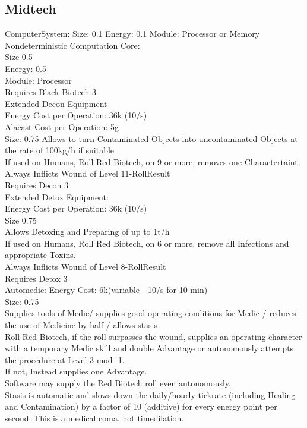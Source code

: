 \subsection{Midtech}
ComputerSystem:
Size: 0.1
Energy: 0.1
Module: Processor or Memory\\
\newline
Nondeterministic Computation Core:\\
Size 0.5\\
Energy: 0.5\\
Module: Processor\\
Requires Black Biotech 3\\
\newline
Extended Decon Equipment\\
Energy Cost per Operation: 36k (10/s)\\
Alacast Cost per Operation: 5g\\
Size: 0.75
Allows to turn Contaminated Objects into uncontaminated Objects at the rate of 100kg/h if suitable\\
If used on Humans, Roll Red Biotech, on 9 or more, removes one Charactertaint.\\
Always Inflicts Wound of Level 11-RollResult\\
Requires Decon 3\\
\newline
Extended Detox Equipment:\\
Energy Cost per Operation: 36k (10/s)\\
Size 0.75\\
Allows Detoxing and Preparing of up to 1t/h\\
If used on Humans, Roll Red Biotech, on 6 or more, remove all Infections and appropriate Toxins.\\
Always Inflicts Wound of Level 8-RollResult\\
Requires Detox 3\\
\newline
Automedic:
Energy Cost: 6k(variable - 10/s for 10 min)\\
Size: 0.75\\
Supplies tools of Medic/ supplies good operating conditions for Medic / reduces the use of Medicine by half / allows stasis\\
Roll Red Biotech, if the roll surpasses the wound, supplies an operating character with a temporary Medic skill and
double Advantage or autonomously attempts the procedure at Level 3 mod -1.\\
If not, Instead supplies one Advantage.\\
Software may supply the Red Biotech roll even autonomously.\\
Stasis is automatic and slows down the daily/hourly tickrate (including Healing and Contamination) by a factor of 10
(additive) for every energy point per second.
This is a medical coma, not timedilation.
